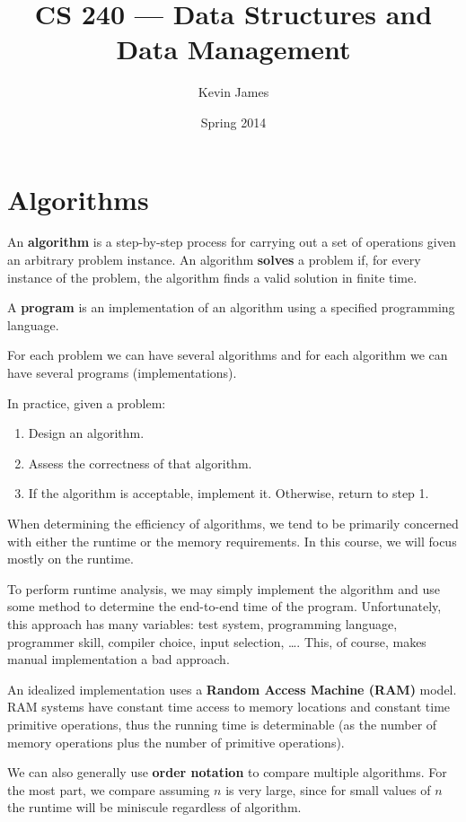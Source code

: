 \documentclass[12pt]{article}
\begin{document}
\title{CS 240 --- Data Structures and Data Management}
\author{Kevin James}
\date{\vspace{-2ex}Spring 2014}
\maketitle\HRule

\section{Algorithms}
An {\bf algorithm} is a step-by-step process for carrying out a set of operations given an arbitrary problem instance. An algorithm {\bf solves} a problem if, for every instance of the problem, the algorithm finds a valid solution in finite time.

A {\bf program} is an implementation of an algorithm using a specified programming language.

For each problem we can have several algorithms and for each algorithm we can have several programs (implementations).

In practice, given a problem:
\begin{enumerate}
\item Design an algorithm.
\item Assess the correctness of that algorithm.
\item If the algorithm is acceptable, implement it. Otherwise, return to step 1.
\end{enumerate}

When determining the efficiency of algorithms, we tend to be primarily concerned with either the runtime or the memory requirements. In this course, we will focus mostly on the runtime.

To perform runtime analysis, we may simply implement the algorithm and use some method to determine the end-to-end time of the program. Unfortunately, this approach has many variables: test system, programming language, programmer skill, compiler choice, input selection, \dots. This, of course, makes manual implementation a bad approach.

An idealized implementation uses a {\bf Random Access Machine (RAM)} model. RAM systems have constant time access to memory locations and constant time primitive operations, thus the running time is determinable (as the number of memory operations plus the number of primitive operations).

We can also generally use {\bf order notation} to compare multiple algorithms. For the most part, we compare assuming $n$ is very large, since for small values of $n$ the runtime will be miniscule regardless of algorithm.
\end{document}
